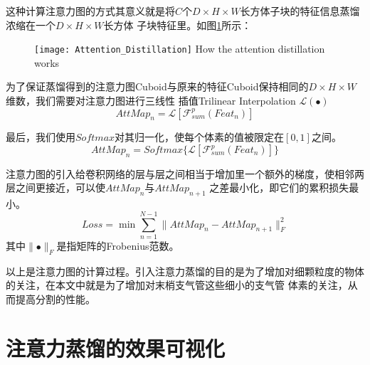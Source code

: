 这种计算注意力图的方式其意义就是将$C$个$D \times H \times W$长方体子块的特征信息蒸馏浓缩在一个$D \times H \times W$长方体
子块特征里。如图\ref{fig:attention_distillation}所示：
\begin{figure}[!htp]
    \centering
    \texttt{[image: Attention\_Distillation]}
        {How the attention distillation works}
    \label{fig:attention_distillation}
\end{figure}

为了保证蒸馏得到的注意力图Cuboid与原来的特征Cuboid保持相同的$D \times H \times W$维数，我们需要对注意力图进行三线性
插值Trilinear Interpolation $\mathcal{L}(\bullet)$
\begin{equation}
    {AttMap}_{n} = \mathcal{L}\left[\mathcal{F}_{sum}^{p}(Feat_{n})\right]
\end{equation}

最后，我们使用$Softmax$对其归一化，使每个体素的值被限定在$[0, 1]$之间。
\begin{equation}
    {AttMap}_{n} = {Softmax}\{ \mathcal{L}\left[\mathcal{F}_{sum}^{p}(Feat_{n})\right] \}
\end{equation}

注意力图的引入给卷积网络的层与层之间相当于增加里一个额外的梯度，使相邻两层之间更接近，可以使${AttMap}_{n}$与${AttMap}_{n+1}$
之差最小化，即它们的累积损失最小。
\begin{equation}\label{eq:attention_distillation_loss}
    Loss = \min \sum_{n=1}^{N-1}\lVert {AttMap}_{n} - {AttMap}_{n+1} \rVert_{F}^{2}
\end{equation}
其中$\lVert \bullet \rVert_{F}$是指矩阵的Frobenius范数。

以上是注意力图的计算过程。引入注意力蒸馏的目的是为了增加对细颗粒度的物体的关注，在本文中就是为了增加对末梢支气管这些细小的支气管
体素的关注，从而提高分割的性能。

\section{注意力蒸馏的效果可视化}

